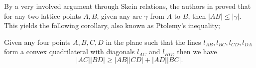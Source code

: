 By a very involved argument through Skein relations, the authors in \cite{KLRS} proved that for any two lattice points $A,B$, given any arc $\gamma$ from $A$ to $B$, then $|AB| \leq |\gamma|$. This yields the following corollary, also known as Ptolemy's inequality;
\begin{corollary}\label{Ptolemy}
Given any four points $A,B,C,D$ in the plane such that the lines $l_{AB},l_{BC},l_{CD},l_{DA}$ form a convex quadrilateral with diagonals $l_{AC}$ and $l_{BD}$, then we have 
\begin{equation*}
    |AC||BD| \geq |AB||CD| + |AD||BC|.
\end{equation*}
\end{corollary}
\begin{figure}[H]
    \centering
    


\begin{tikzpicture}[x=0.75pt,y=0.75pt,yscale=-1,xscale=1]


\end{tikzpicture}
\end{figure}
